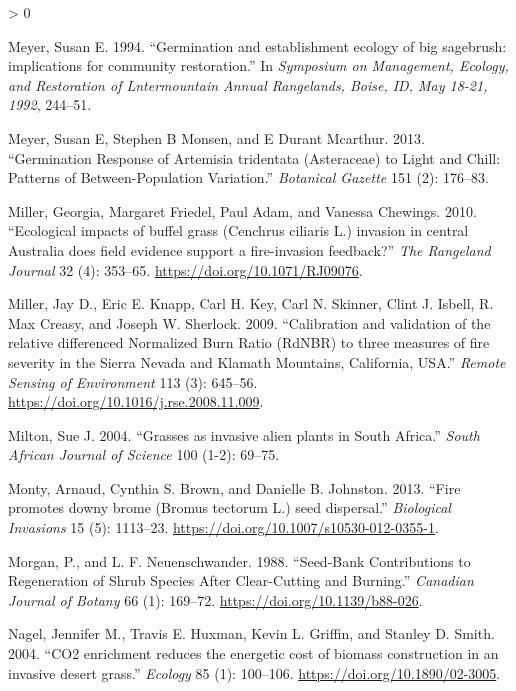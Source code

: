 \documentclass[
  12pt,
]{article}
\newlength{\cslhangindent}
\newenvironment{CSLReferences}[2] %
 {%
  \setlength{\parindent}{0pt}
  \ifodd #1 \everypar{\setlength{\hangindent}{\cslhangindent}}\ignorespaces\fi
  \ifnum #2 > 0
  \setlength{\parskip}{#2\baselineskip}
  \fi
 }%
 {}
\begin{document}
\begin{CSLReferences}{1}{0}
\leavevmode\hypertarget{ref-Meyer1994}{}%
Meyer, Susan E. 1994. {``{Germination and establishment ecology of big
sagebrush: implications for community restoration}.''} In
\emph{Symposium on Management, Ecology, and Restoration of Lntermountain
Annual Rangelands, Boise, ID, May 18-21, 1992}, 244--51.

\leavevmode\hypertarget{ref-Meyer2013}{}%
Meyer, Susan E, Stephen B Monsen, and E Durant Mcarthur. 2013.
{``{Germination Response of Artemisia tridentata (Asteraceae) to Light
and Chill: Patterns of Between-Population Variation}.''} \emph{Botanical
Gazette} 151 (2): 176--83.

\leavevmode\hypertarget{ref-Miller2010}{}%
Miller, Georgia, Margaret Friedel, Paul Adam, and Vanessa Chewings.
2010. {``{Ecological impacts of buffel grass (Cenchrus ciliaris L.)
invasion in central Australia does field evidence support a
fire-invasion feedback?}''} \emph{The Rangeland Journal} 32 (4):
353--65. \url{https://doi.org/10.1071/RJ09076}.

\leavevmode\hypertarget{ref-Miller2009}{}%
Miller, Jay D., Eric E. Knapp, Carl H. Key, Carl N. Skinner, Clint J.
Isbell, R. Max Creasy, and Joseph W. Sherlock. 2009. {``{Calibration and
validation of the relative differenced Normalized Burn Ratio (RdNBR) to
three measures of fire severity in the Sierra Nevada and Klamath
Mountains, California, USA}.''} \emph{Remote Sensing of Environment} 113
(3): 645--56. \url{https://doi.org/10.1016/j.rse.2008.11.009}.

\leavevmode\hypertarget{ref-Milton2004}{}%
Milton, Sue J. 2004. {``{Grasses as invasive alien plants in South
Africa}.''} \emph{South African Journal of Science} 100 (1-2): 69--75.

\leavevmode\hypertarget{ref-Monty2013}{}%
Monty, Arnaud, Cynthia S. Brown, and Danielle B. Johnston. 2013.
{``{Fire promotes downy brome (Bromus tectorum L.) seed dispersal}.''}
\emph{Biological Invasions} 15 (5): 1113--23.
\url{https://doi.org/10.1007/s10530-012-0355-1}.

\leavevmode\hypertarget{ref-Morgan1988}{}%
Morgan, P., and L. F. Neuenschwander. 1988. {``Seed-Bank Contributions
to Regeneration of Shrub Species After Clear-Cutting and Burning.''}
\emph{Canadian Journal of Botany} 66 (1): 169--72.
\url{https://doi.org/10.1139/b88-026}.

\leavevmode\hypertarget{ref-Nagel2004}{}%
Nagel, Jennifer M., Travis E. Huxman, Kevin L. Griffin, and Stanley D.
Smith. 2004. {``{CO2 enrichment reduces the energetic cost of biomass
construction in an invasive desert grass}.''} \emph{Ecology} 85 (1):
100--106. \url{https://doi.org/10.1890/02-3005}.


\end{CSLReferences}
\end{document}
